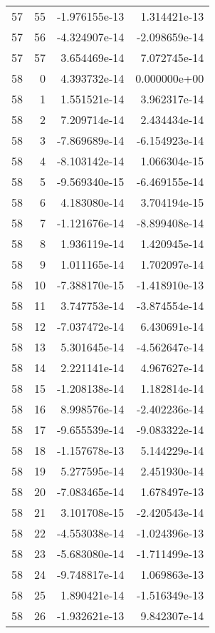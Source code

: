 \begin{tabular}{rrrr}
  57 &   55 & -1.976155e-13 &  1.314421e-13 \\
  57 &   56 & -4.324907e-14 & -2.098659e-14 \\
  57 &   57 &  3.654469e-14 &  7.072745e-14 \\
  58 &    0 &  4.393732e-14 &  0.000000e+00 \\
  58 &    1 &  1.551521e-14 &  3.962317e-14 \\
  58 &    2 &  7.209714e-14 &  2.434434e-14 \\
  58 &    3 & -7.869689e-14 & -6.154923e-14 \\
  58 &    4 & -8.103142e-14 &  1.066304e-15 \\
  58 &    5 & -9.569340e-15 & -6.469155e-14 \\
  58 &    6 &  4.183080e-14 &  3.704194e-15 \\
  58 &    7 & -1.121676e-14 & -8.899408e-14 \\
  58 &    8 &  1.936119e-14 &  1.420945e-14 \\
  58 &    9 &  1.011165e-14 &  1.702097e-14 \\
  58 &   10 & -7.388170e-15 & -1.418910e-13 \\
  58 &   11 &  3.747753e-14 & -3.874554e-14 \\
  58 &   12 & -7.037472e-14 &  6.430691e-14 \\
  58 &   13 &  5.301645e-14 & -4.562647e-14 \\
  58 &   14 &  2.221141e-14 &  4.967627e-14 \\
  58 &   15 & -1.208138e-14 &  1.182814e-14 \\
  58 &   16 &  8.998576e-14 & -2.402236e-14 \\
  58 &   17 & -9.655539e-14 & -9.083322e-14 \\
  58 &   18 & -1.157678e-13 &  5.144229e-14 \\
  58 &   19 &  5.277595e-14 &  2.451930e-14 \\
  58 &   20 & -7.083465e-14 &  1.678497e-13 \\
  58 &   21 &  3.101708e-15 & -2.420543e-14 \\
  58 &   22 & -4.553038e-14 & -1.024396e-13 \\
  58 &   23 & -5.683080e-14 & -1.711499e-13 \\
  58 &   24 & -9.748817e-14 &  1.069863e-13 \\
  58 &   25 &  1.890421e-14 & -1.516349e-13 \\
  58 &   26 & -1.932621e-13 &  9.842307e-14 \\

\end{tabular}
